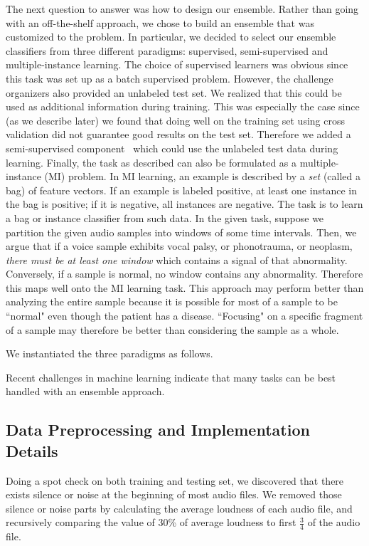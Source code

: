 The next question to answer was how to design our ensemble. Rather than going with an off-the-shelf approach, we chose to build an ensemble that was customized to the problem. In particular, we decided to select our ensemble classifiers from three different paradigms: supervised, semi-supervised and multiple-instance learning. The choice of supervised learners was obvious since this task was set up as a batch supervised problem. However, the challenge organizers also provided an unlabeled test set. We realized that this could be used as additional information during training. This was especially the case since (as we describe later) we found that doing well on the training set  using cross validation did not guarantee good results on the test set. Therefore we added a semi-supervised component~\cite{} which could use the unlabeled test data during learning. Finally, the task as described can also be formulated as a multiple-instance (MI) problem. In MI learning, an example is described by a {\em set} (called a bag) of feature vectors. If an example is labeled positive, at least one instance in the bag is positive; if it is negative, all instances are negative. The task is to learn a bag or instance classifier from such data. In the given task, suppose we partition the given audio samples into windows of some time intervals. Then, we argue that if a voice sample exhibits vocal palsy, or phonotrauma, or neoplasm, {\em there must be at least one window} which contains a signal of that abnormality. Conversely, if a sample is normal, no window contains any abnormality. Therefore this maps well onto the MI learning task. This approach may perform better than analyzing the entire sample because it is possible for most of a sample to be ``normal" even though the patient has a disease. ``Focusing" on a specific fragment of a sample may therefore be better than considering the sample as a whole.

We instantiated the three paradigms as follows.  


Recent challenges in machine learning indicate that many tasks can be best handled with an ensemble approach. 
\subsection{Data Preprocessing and Implementation Details}
	Doing a spot check on both training and testing set, we discovered that there exists silence or noise at the beginning of most audio files. We removed those silence or noise parts by calculating the average loudness of each audio file, and recursively comparing the value of 30\% of average loudness to first $\frac{3}{4}$ of the audio file.

